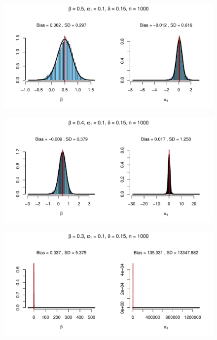 \documentclass{beamer}
\begin{document}
\begin{frame}[plain,c]

  \begin{figure}[h]
    \centering
    \includegraphics[width=\textwidth]{Rplot9}
  \end{figure}

\end{frame}
\begin{frame}[plain,c]

  \begin{figure}[h]
    \centering
    \includegraphics[width=\textwidth]{Rplot10}
  \end{figure}

\end{frame}
\begin{frame}[plain,c]

  \begin{figure}[h]
    \centering
    \includegraphics[width=\textwidth]{Rplot11}
  \end{figure}

\end{frame}
\end{document}
